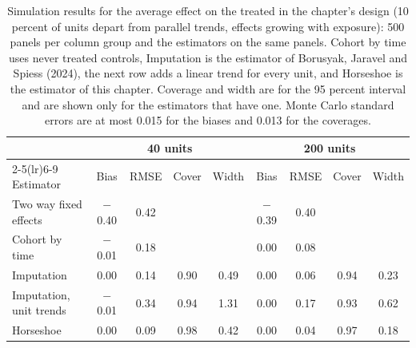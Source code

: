 \begin{table}[ht]
\centering
\caption{Simulation results for the average effect on the treated in the chapter's design (10 percent of units depart from parallel trends, effects growing with exposure): 500 panels per column group and the estimators on the same panels. Cohort by time uses never treated controls, Imputation is the estimator of Borusyak, Jaravel and Spiess (2024), the next row adds a linear trend for every unit, and Horseshoe is the estimator of this chapter. Coverage and width are for the 95 percent interval and are shown only for the estimators that have one. Monte Carlo standard errors are at most 0.015 for the biases and 0.013 for the coverages.}
\label{tab:didsim}
\footnotesize
\setlength{\tabcolsep}{4pt}
\begin{tabular}{@{}lcccccccc@{}}
\toprule
& \multicolumn{4}{c}{40 units} & \multicolumn{4}{c}{200 units} \\
\cmidrule(lr){2-5}\cmidrule(lr){6-9}
Estimator & Bias & RMSE & Cover & Width & Bias & RMSE & Cover & Width \\
\midrule
Two way fixed effects & $-$0.40 & 0.42 &  &  & $-$0.39 & 0.40 &  &  \\
Cohort by time & $-$0.01 & 0.18 &  &  & 0.00 & 0.08 &  &  \\
Imputation & 0.00 & 0.14 & 0.90 & 0.49 & 0.00 & 0.06 & 0.94 & 0.23 \\
Imputation, unit trends & $-$0.01 & 0.34 & 0.94 & 1.31 & 0.00 & 0.17 & 0.93 & 0.62 \\
Horseshoe & 0.00 & 0.09 & 0.98 & 0.42 & 0.00 & 0.04 & 0.97 & 0.18 \\
\bottomrule
\end{tabular}
\end{table}
